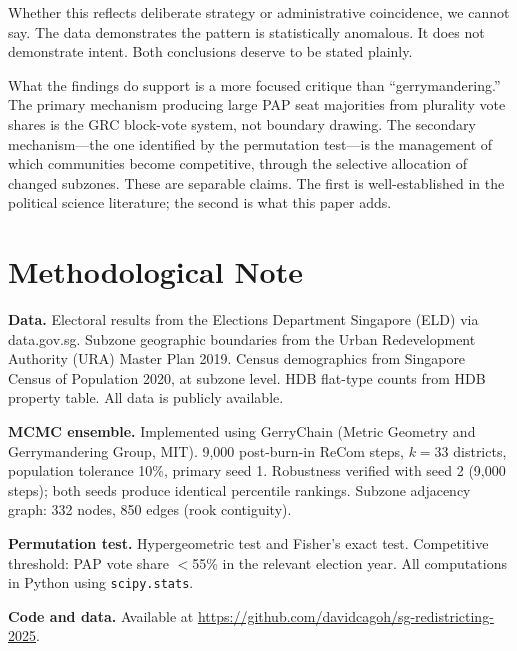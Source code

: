 \documentclass[12pt]{article}
\begin{document}
Whether this reflects deliberate strategy or administrative coincidence, we cannot say. The data
demonstrates the pattern is statistically anomalous. It does not demonstrate intent. Both
conclusions deserve to be stated plainly.

What the findings do support is a more focused critique than ``gerrymandering.'' The primary
mechanism producing large PAP seat majorities from plurality vote shares is the GRC block-vote
system, not boundary drawing. The secondary mechanism---the one identified by the permutation
test---is the management of which communities become competitive, through the selective allocation
of changed subzones. These are separable claims. The first is well-established in the political
science literature; the second is what this paper adds.

\section*{Methodological Note}

\textbf{Data.} Electoral results from the Elections Department Singapore (ELD) via data.gov.sg.
Subzone geographic boundaries from the Urban Redevelopment Authority (URA) Master Plan 2019.
Census demographics from Singapore Census of Population 2020, at subzone level. HDB flat-type
counts from HDB property table. All data is publicly available.

\textbf{MCMC ensemble.} Implemented using GerryChain (Metric Geometry and Gerrymandering Group,
MIT). 9,000 post-burn-in ReCom steps, $k=33$ districts, population tolerance 10\%, primary seed 1.
Robustness verified with seed 2 (9,000 steps); both seeds produce identical percentile rankings.
Subzone adjacency graph: 332 nodes, 850 edges (rook contiguity).

\textbf{Permutation test.} Hypergeometric test and Fisher's exact test. Competitive threshold: PAP
vote share $<$55\% in the relevant election year. All computations in Python using
\texttt{scipy.stats}.

\textbf{Code and data.} Available at \url{https://github.com/davidcagoh/sg-redistricting-2025}.
\end{document}
